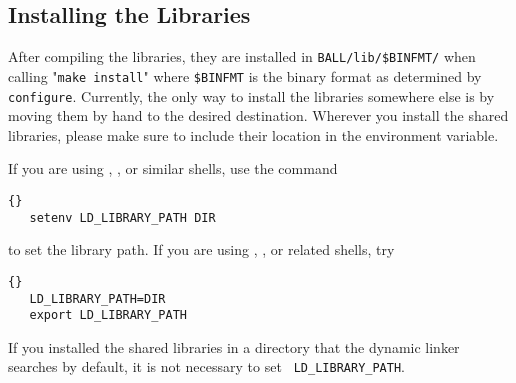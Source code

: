 \subsection{Installing the Libraries}

After compiling the libraries, they are installed in {\tt BALL/lib/\${BINFMT}/}
when calling "{\tt make install}" where {\tt \${BINFMT}} is the binary format
as determined by {\tt configure}.  Currently, the only way to install the
libraries somewhere else is by moving them by hand to the desired destination.
Wherever you install the shared libraries, please make sure to include their
location in the  environment variable.

If you are using , , or similar shells, use the command

\begin{lstlisting}{}
   setenv LD_LIBRARY_PATH DIR
\end{lstlisting}

\noindent to set the library path. If you are using , ,
or related shells, try

\begin{lstlisting}{}   
   LD_LIBRARY_PATH=DIR
   export LD_LIBRARY_PATH
\end{lstlisting}

If you installed the shared libraries in a directory that the dynamic linker
 searches by default, it is not necessary to set {\tt
LD\_LIBRARY\_PATH}.
